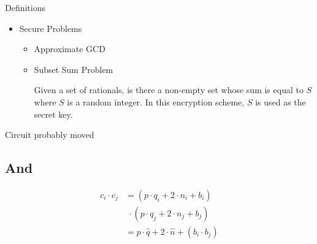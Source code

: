 \documentclass[a0,portrait]{a0poster}
\begin{document}
\begin{multicols}{2}
\begin{slide}{Definitions}
\begin{itemize}
  Re-encrypting already encrypted data using elements from the original encryption circuit.
\begin{itemize}
\item Compact
\end{itemize}
\item Secure Problems
\begin{itemize}
\item Approximate GCD

\item Subset Sum Problem 

  Given a set of rationals, is there a non-empty set whose sum is equal to $S$ where $S$ is a random integer. In this encryption scheme, $S$ is used as the secret key.

\end{itemize}

\end{itemize}


\end{slide}


\begin{slide}{Circuit probably moved}

\begin{multicols}{2}

\subsection*{{\sc And}}
\begin{align*}
  c_i\cdot c_j &= \left(p\cdot q_i + 2\cdot n_i + b_i\right)\\&\;\cdot\left(p\cdot q_j + 2\cdot n_j + b_j\right)\\
  &= p\cdot\hat{q} + 2\cdot\hat{n} + \left(b_i\cdot b_j\right)
\end{align*}



\end{multicols}
\end{slide}
\end{multicols}
\end{document}
